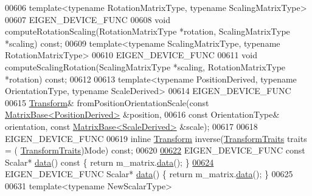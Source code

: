 \begin{DoxyCode}
00606   \textcolor{keyword}{template}<\textcolor{keyword}{typename} RotationMatrixType, \textcolor{keyword}{typename} ScalingMatrixType>
00607   EIGEN\_DEVICE\_FUNC
00608   \textcolor{keywordtype}{void} computeRotationScaling(RotationMatrixType *rotation, ScalingMatrixType *scaling) \textcolor{keyword}{const};
00609   \textcolor{keyword}{template}<\textcolor{keyword}{typename} ScalingMatrixType, \textcolor{keyword}{typename} RotationMatrixType>
00610   EIGEN\_DEVICE\_FUNC
00611   \textcolor{keywordtype}{void} computeScalingRotation(ScalingMatrixType *scaling, RotationMatrixType *rotation) \textcolor{keyword}{const};
00612 
00613   \textcolor{keyword}{template}<\textcolor{keyword}{typename} PositionDerived, \textcolor{keyword}{typename} OrientationType, \textcolor{keyword}{typename} ScaleDerived>
00614   EIGEN\_DEVICE\_FUNC
00615   \hyperlink{group___geometry___module_class_eigen_1_1_transform}{Transform}& fromPositionOrientationScale(\textcolor{keyword}{const} 
      \hyperlink{group___core___module_class_eigen_1_1_matrix_base}{MatrixBase<PositionDerived>} &position,
00616     \textcolor{keyword}{const} OrientationType& orientation, \textcolor{keyword}{const} \hyperlink{group___core___module_class_eigen_1_1_matrix_base}{MatrixBase<ScaleDerived>} &scale);
00617 
00618   EIGEN\_DEVICE\_FUNC
00619   \textcolor{keyword}{inline} \hyperlink{group___geometry___module_class_eigen_1_1_transform}{Transform} inverse(\hyperlink{group__enums_gaee59a86102f150923b0cac6d4ff05107}{TransformTraits} traits = (
      \hyperlink{group__enums_gaee59a86102f150923b0cac6d4ff05107}{TransformTraits})Mode) \textcolor{keyword}{const};
00620 
\hyperlink{group___geometry___module_a75c33d8e3769936887149c9fca3e709f}{00622}   EIGEN\_DEVICE\_FUNC \textcolor{keyword}{const} Scalar* \hyperlink{group___geometry___module_a75c33d8e3769936887149c9fca3e709f}{data}()\textcolor{keyword}{ const }\{ \textcolor{keywordflow}{return} m\_matrix.\hyperlink{class_eigen_1_1_plain_object_base_ac25699535374b1854cf8494e44ad31b2}{data}(); \}
\hyperlink{group___geometry___module_a57a9ca46062164c4f14342e561e595b9}{00624}   EIGEN\_DEVICE\_FUNC Scalar* \hyperlink{group___geometry___module_a57a9ca46062164c4f14342e561e595b9}{data}() \{ \textcolor{keywordflow}{return} m\_matrix.\hyperlink{class_eigen_1_1_plain_object_base_ac25699535374b1854cf8494e44ad31b2}{data}(); \}
00625 
00631   \textcolor{keyword}{template}<\textcolor{keyword}{typename} NewScalarType>

\end{DoxyCode}
